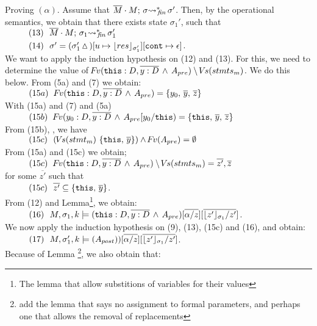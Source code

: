 \begin{description}
 \vspace{.1cm}
Proving $(\alpha)$. Assume that   $\leadstoBoundedStarFin  {\Mtwo\cdot M}  {\sigma}  {\sigma'}$. Then, by the operational semantics, we obtain that 
there exists state $\sigma_1'$, such that \\
$\SPS (13) \ \ \leadstoBoundedStarFin  {\Mtwo\cdot M}  {\sigma_1}  {\sigma_1'}$ \\
$\SPS (14) \ \ \sigma'=(\sigma_1'\popSymbol)[u \mapsto {\interpret {\sigma_1'} {res}}][\prg{cont}\mapsto \epsilon]$.
\\
We want to apply the induction hypothesis on (12) and (13). For this, we need to determine the value of  $\fv(\prg{this}:D,\overline{y:D}\, \wedge\, A_{pre})  \setminus \vs(stmts_m)$.  We do this below. From (5a) and (7) we obtain:\\
$\SPS (15a) \ \ \fv(\prg{this}:D,\overline{y:D}\, \wedge\, A_{pre}) =  \{ y_0,\, \overline{y},\, \overline z \} $\\
With    (15a) and (7) and (5a) \\
$\SPS (15b) \ \  \fv(y_0:D,\overline{y:D}\, \wedge\, A_{pre}[y_0/\prg{this}) =  \{ \prg{this},\, \overline{y},\,  \overline z \} $
\\
From (15b), {}, we have \\
$\SPS (15c) \ \  (\vs(stmt_m) \ \{ \prg{this},\, \overline y \})\wedge \fv(A_{pre}) =  \emptyset$
\\
From (15a) and (15c) we obtain;\\
$\SPS (15c) \ \  \fv(\prg{this}:D,\overline{y:D}\, \wedge\, A_{pre})  \setminus \vs(stmts_m) =  \overline {z'}, \overline {z}$
\\
for some $\overline {z'}$ such that
\\
$\SPS (15c)  \ \ \overline {z'} \subseteq  \{ \prg{this},\, \overline{y} \}$.
\\
From (12) and Lemma\footnote{The lemma that allow substitions of variables for their values}, we obtain:
\\
$\SPS (16) \ \  \satDAssertFrom M  {\sigma_1} {k}   {(\prg{this}:D,\overline{y:D}\, \wedge\, A_{pre})[\overline{\alpha/z}][\overline{\interpret {\sigma_1} {z'} /z'}]}$.
\\
We now apply the induction hypothesis on (9), (13), (15c) and (16), and obtain:
\\ 
$\SPS (17) \ \  \satDAssertFrom M  {\sigma_1'} {k}   {(A_{post}))[\overline{\alpha/z}][\overline{\interpret {\sigma_1} {z'} /z'}]}$.
\\
Because of Lemma \footnote{add the lemma that says no assignment to formal parameters, and perhaps one that allows the removal of replacements}, we also obtain that:

\end{description}

